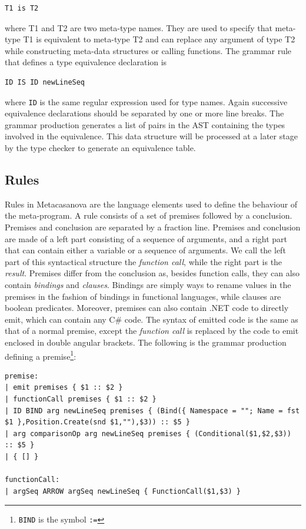 \begin{lstlisting}
T1 is T2
\end{lstlisting}

where T1 and T2 are two meta-type names. They are used to specify that meta-type T1 is equivalent to meta-type T2 and can replace any argument of type T2 while constructing meta-data structures or calling functions. The grammar rule that defines a type equivalence declaration is

\begin{lstlisting}
ID IS ID newLineSeq
\end{lstlisting}

\noindent
where \texttt{ID} is the same regular expression used for type names. Again successive equivalence declarations should be separated by one or more line breaks. The grammar production generates a list of pairs in the AST containing the types involved in the equivalence. This data structure will be processed at a later stage by the type checker to generate an equivalence table.

\subsection{Rules}
\label{sec:ch_metacasanova_parser_rules}
Rules in Metacasanova are the language elements used to define the behaviour of the meta-program. A rule consists of a set of premises followed by a conclusion. Premises and conclusion are separated by a fraction line. Premises and conclusion are made of a left part consisting of a sequence of arguments, and a right part that can contain either a variable or a sequence of arguments. We call the left part of this syntactical structure the \textit{function call}, while the right part is the \textit{result}. Premises differ from the conclusion as, besides function calls, they can also contain \textit{bindings} and \textit{clauses}. Bindings are simply ways to rename values in the premises in the fashion of bindings in functional languages, while clauses are boolean predicates. Moreover, premises can also contain .NET code to directly emit, which can contain any C\# code. The syntax of emitted code is the same as that of a normal premise, except the \textit{function call} is replaced by the code to emit enclosed in double angular brackets. The following is the grammar production defining a premise\footnote{ \texttt{BIND} is the symbol \texttt{:=}}:

\begin{lstlisting}
premise:
| emit premises { $1 :: $2 }
| functionCall premises { $1 :: $2 }
| ID BIND arg newLineSeq premises { (Bind({ Namespace = ""; Name = fst $1 },Position.Create(snd $1,""),$3)) :: $5 }
| arg comparisonOp arg newLineSeq premises { (Conditional($1,$2,$3)) :: $5 }
| { [] }

functionCall:
| argSeq ARROW argSeq newLineSeq { FunctionCall($1,$3) }
\end{lstlisting}

